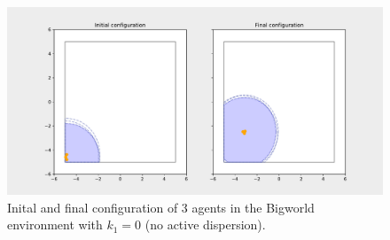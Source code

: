 \begin{figure}[H]
  \centering
  \includegraphics[width=\textwidth]{figs/bigworld_3_agnt_k_1_0_k_2_1_distr.pdf}
  \caption{Inital and final configuration of 3 agents in the Bigworld environment with $k_{1} = 0$ (no active dispersion).}
  \label{fig:3_agnt_bw_k_1_0_k_2_1_distr}
\end{figure}
